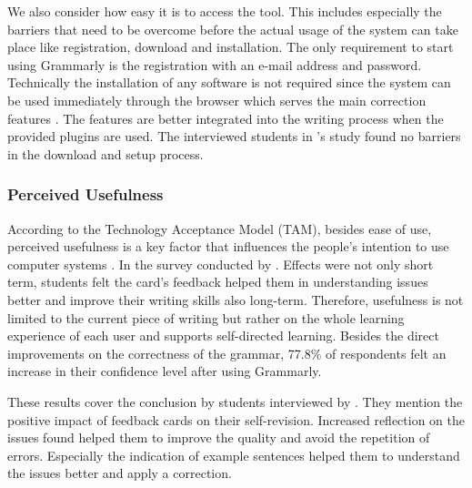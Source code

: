 \documentclass[runningheads]{llncs}
\begin{document}
We also consider how easy it is to access the tool. This includes especially the barriers that need to be overcome before the actual usage of the system can take place like registration, download and installation. The only requirement to start using Grammarly is the registration with an e-mail address and password. Technically the installation of any software is not required since the system can be used immediately through the browser which serves the main correction features \citep{noauthor_write_nodate}. The features are better integrated into the writing process when the provided plugins are used. The interviewed students in \citeauthor{nova_utilizing_2018}'s study found no barriers in the download and setup process.

\subsubsection{Perceived Usefulness} 
According to the Technology Acceptance Model (TAM), besides ease of use, perceived usefulness is a key factor that influences the people's intention to use computer systems \citep{davis_user_1989}. In the survey conducted by \citeauthor{cavaleri_you_2016} . Effects were not only short term, students felt the card's feedback helped them in understanding issues better and improve their writing skills also long-term. Therefore, usefulness is not limited to the current piece of writing but rather on the whole learning experience of each user and supports self-directed learning. Besides the direct improvements on the correctness of the grammar, 77.8\% of respondents felt an increase in their confidence level after using Grammarly. 

These results cover the conclusion by students interviewed by \citep{nova_utilizing_2018}. They mention the positive impact of feedback cards on their self-revision. Increased reflection on the issues found helped them to improve the quality and avoid the repetition of errors. Especially the indication of example sentences helped them to understand the issues better and apply a correction.
\end{document}
